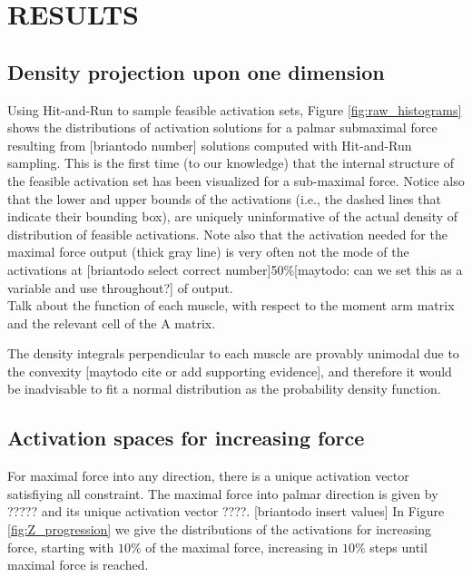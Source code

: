 

\section{RESULTS}
\subsection{Density projection upon one dimension} %
\label{ssub:density_projection_upon_one_dimension}

Using Hit-and-Run to sample feasible activation sets, Figure \ref{fig:raw_histograms} shows the distributions of activation solutions for a palmar submaximal force resulting from [briantodo number] solutions computed with Hit-and-Run sampling. This is the first time (to our knowledge) that the internal structure of the feasible activation set has been visualized for a sub-maximal force.
Notice also that the lower and upper bounds of the activations (i.e., the dashed lines that indicate their bounding box), are uniquely uninformative of the actual density of distribution of feasible activations. Note also that the activation needed for the maximal force output (thick gray line) is very often not the mode of the activations at [briantodo select correct number]50\%[maytodo: can we set this as a variable and use throughout?] of output.
\\

Talk about the function of each muscle, with respect to the moment arm matrix and the relevant cell of the A matrix.

The density integrals perpendicular to each muscle are provably unimodal due to the convexity [maytodo cite or add supporting evidence], and therefore it would be inadvisable to fit a normal distribution as the probability density function.

\subsection{Activation spaces for increasing force} %
\label{sub:activation_spaces_for_increasing_force}
For maximal force into any direction, there is a unique activation vector satisfiying all constraint. The maximal force into palmar direction is given by ????? and its unique activation vector ????. [briantodo insert values]
In Figure \ref{fig:Z_progression} we give the distributions of the activations for increasing force, starting with $10\%$ of the maximal force, increasing in $10\%$ steps until maximal force is reached.

